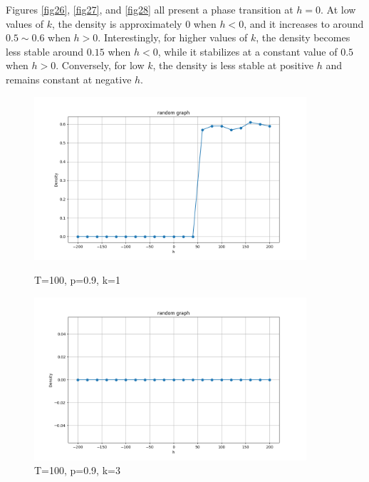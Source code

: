 \documentclass[11pt]{book}
\begin{document}
Figures \eqref{fig26}, \eqref{fig27}, and \eqref{fig28} all present a phase transition at $h=0$. At low values of $k$, the density is approximately $0$ when $h<0$, and it increases to around $0.5 \sim 0.6$ when $h>0$. Interestingly, for higher values of $k$, the density becomes less stable around $0.15$ when $h< 0$, while it stabilizes at a constant value of $0.5$ when $h>0$. Conversely, for low $k$, the density is less stable at positive $h$ and remains constant at negative $h$.

\begin{figure}
    \centering
    \begin{minipage}{0.45\textwidth}
        \centering
        \includegraphics[width=0.9\textwidth]{rg,T=100,p=0.9,k=1.png} %
        \caption{T=100, p=0.9, k=1}
        \label{fig29}
    \end{minipage}\hfill
    \begin{minipage}{0.45\textwidth}
        \centering
        \includegraphics[width=0.9\textwidth]{rg. T=100, p=0.9, k=3.png} %
        \caption{T=100, p=0.9, k=3}
        \label{fig30}
    \end{minipage}

\end{figure}
\end{document}

